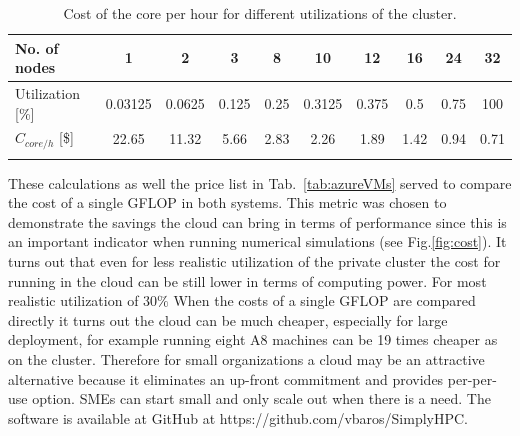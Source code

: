 \documentclass[3p,times]{elsarticle}
\begin{document}
\begin{table}[h]
\begin{tabular}{lccccccccc}
\hline
\multicolumn{1}{|l|}{No. of nodes}          & \multicolumn{1}{c|}{1}       & \multicolumn{1}{c|}{2}      & \multicolumn{1}{c|}{3}     & \multicolumn{1}{c|}{8}    & \multicolumn{1}{c|}{10}     & \multicolumn{1}{c|}{12}    & \multicolumn{1}{c|}{16}   & \multicolumn{1}{c|}{24}   & \multicolumn{1}{c|}{32}   \\ \hline
\multicolumn{1}{|l|}{Utilization {[}\%{]}}  & \multicolumn{1}{c|}{0.03125} & \multicolumn{1}{c|}{0.0625} & \multicolumn{1}{c|}{0.125} & \multicolumn{1}{c|}{0.25} & \multicolumn{1}{c|}{0.3125} & \multicolumn{1}{c|}{0.375} & \multicolumn{1}{c|}{0.5}  & \multicolumn{1}{c|}{0.75} & \multicolumn{1}{c|}{100}  \\ \hline
\multicolumn{1}{|l|}{$C_{core/h}$ {[}\${]}} & \multicolumn{1}{c|}{22.65}   & \multicolumn{1}{c|}{11.32}  & \multicolumn{1}{c|}{5.66}  & \multicolumn{1}{c|}{2.83} & \multicolumn{1}{c|}{2.26}   & \multicolumn{1}{c|}{1.89}  & \multicolumn{1}{c|}{1.42} & \multicolumn{1}{c|}{0.94} & \multicolumn{1}{c|}{0.71} \\ \hline
                                            & \multicolumn{1}{l}{}         & \multicolumn{1}{l}{}        & \multicolumn{1}{l}{}       & \multicolumn{1}{l}{}      & \multicolumn{1}{l}{}        & \multicolumn{1}{l}{}       & \multicolumn{1}{l}{}      & \multicolumn{1}{l}{}      & \multicolumn{1}{l}{}     
\end{tabular}
\label{tab:cost}
\caption{Cost of the core per hour for different utilizations of the cluster. }
\end{table}

These calculations as well the price list in Tab.~\ref{tab:azureVMs} served to compare the cost of a single GFLOP in both systems. This metric was chosen to demonstrate the savings the cloud can bring in terms of performance since this is an important indicator when running numerical simulations (see Fig.\ref{fig:cost}). It turns out that even for less realistic utilization of the private cluster the cost for running in the cloud can be still lower in terms of computing power. For most realistic utilization of $30\%$ When the costs of a single GFLOP are compared directly it turns out the cloud can be much cheaper, especially for large deployment, for example running eight A8 machines can be 19 times cheaper as on the cluster. Therefore for small organizations a cloud may be an attractive alternative because it eliminates an up-front commitment and provides per-per-use option. SMEs can start small and only scale out when there is a need. The software is available at GitHub at https://github.com/vbaros/SimplyHPC.
 
\end{document}
